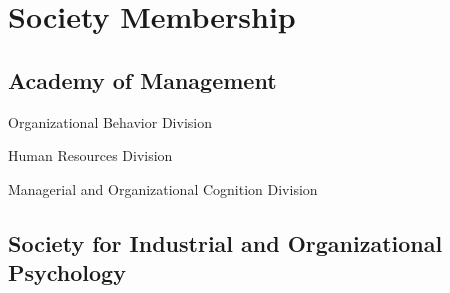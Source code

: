\documentclass[12pt,letterpaper]{report} %
\newcommand{\listitemspace}{0.2em}
\renewenvironment{itemize}
{\begin{list}{}{\setlength{\leftmargin}{0em}
                \setlength{\parskip}{0em}
                \setlength{\itemsep}{\listitemspace}
                \setlength{\parsep}{\listitemspace}}}
{\end{list}}
\begin{document}







    \section*{Society Membership}

    \subsection*{Academy of Management}

    \begin{itemize}

        \item Organizational Behavior Division
        \item Human Resources Division
        \item Managerial and Organizational Cognition Division

    \end{itemize}


    \subsection*{Society for Industrial and Organizational Psychology}


\end{document}
